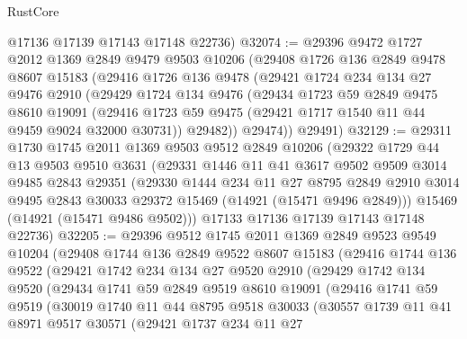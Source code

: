 \begin{lexlean}{RustCore}
\begin{coremodule}
      @17136
      @17139
      @17143
      @17148
      @22736)
@32074 := @29396
    @9472
    @1727
    @2012
    @1369
    @2849
    @9479
    @9503
    @10206
    (@29408
      @1726
      @136
      @2849
      @9478
      @8607
      @15183
      (@29416
        @1726
        @136
        @9478
        (@29421
          @1724
          @234
          @134
          @27
          @9476
          @2910
          (@29429
            @1724
            @134
            @9476
            (@29434
              @1723
              @59
              @2849
              @9475
              @8610
              @19091
              (@29416 @1723 @59 @9475 (@29421 @1717 @1540 @11 @44 @9459 @9024 @32000 @30731))
              @29482))
          @29474))
      @29491)
@32129 := @29311
    @1730
    @1745
    @2011
    @1369
    @9503
    @9512
    @2849
    @10206
    (@29322
      @1729
      @44
      @13
      @9503
      @9510
      @3631
      (@29331
        @1446
        @11
        @41
        @3617
        @9502
        @9509
        @3014
        @9485
        @2843
        @29351
        (@29330
          @1444
          @234
          @11
          @27
          @8795
          @2849
          @2910
          @3014
          @9495
          @2843
          @30033
          @29372
          @15469
          (@14921 (@15471 @9496 @2849)))
        @15469
        (@14921 (@15471 @9486 @9502)))
      @17133
      @17136
      @17139
      @17143
      @17148
      @22736)
@32205 := @29396
    @9512
    @1745
    @2011
    @1369
    @2849
    @9523
    @9549
    @10204
    (@29408
      @1744
      @136
      @2849
      @9522
      @8607
      @15183
      (@29416
        @1744
        @136
        @9522
        (@29421
          @1742
          @234
          @134
          @27
          @9520
          @2910
          (@29429
            @1742
            @134
            @9520
            (@29434
              @1741
              @59
              @2849
              @9519
              @8610
              @19091
              (@29416
                @1741
                @59
                @9519
                (@30019
                  @1740
                  @11
                  @44
                  @8795
                  @9518
                  @30033
                  (@30557
                    @1739
                    @11
                    @41
                    @8971
                    @9517
                    @30571
                    (@29421
                      @1737
                      @234
                      @11
                      @27

\end{coremodule}
\end{lexlean}
